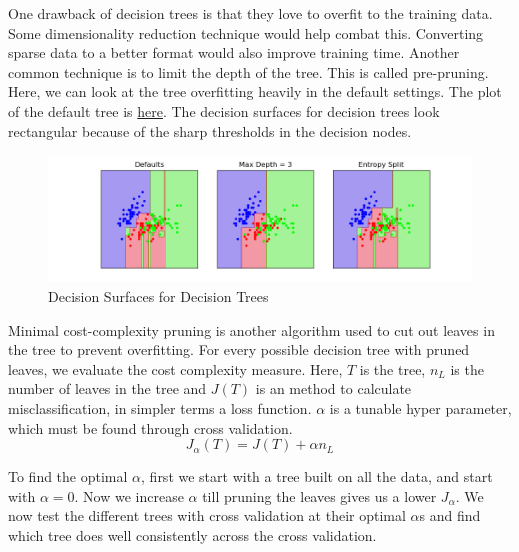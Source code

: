 \documentclass{article}
\begin{document}
One drawback of decision trees is that they love to overfit to the training data. Some dimensionality reduction technique would help combat this. Converting sparse data to a better format would also improve training time. Another common technique is to limit the depth of the tree. This is called pre-pruning. Here, we can look at the tree overfitting heavily in the default settings. The plot of the default tree is \href{https://github.com/sbalan7/ML-and-Stats/blob/master/Images/tree_hi_res.png}{here}. The decision surfaces for decision trees look rectangular because of the sharp thresholds in the decision nodes.

\begin{figure}[H]
\includegraphics[width=\linewidth]{Images/decision_tree_surfaces.png}
\centering
\caption{Decision Surfaces for Decision Trees}
\end{figure}

Minimal cost-complexity pruning is another algorithm used to cut out leaves in the tree to prevent overfitting. For every possible decision tree with pruned leaves, we evaluate the cost complexity measure. Here, $T$ is the tree, $n_L$ is the number of leaves in the tree and $J(T)$ is an method to calculate misclassification, in simpler terms a loss function. $\alpha$ is a tunable hyper parameter, which must be found through cross validation.
$$J_{\alpha}(T) = J(T) + \alpha n_L$$

To find the optimal $\alpha$, first we start with a tree built on all the data, and start with $\alpha=0$. Now we increase $\alpha$ till pruning the leaves gives us a lower $J_{\alpha}$. We now test the different trees with cross validation at their optimal $\alpha$s and find which tree does well consistently across the cross validation.
\end{document}
